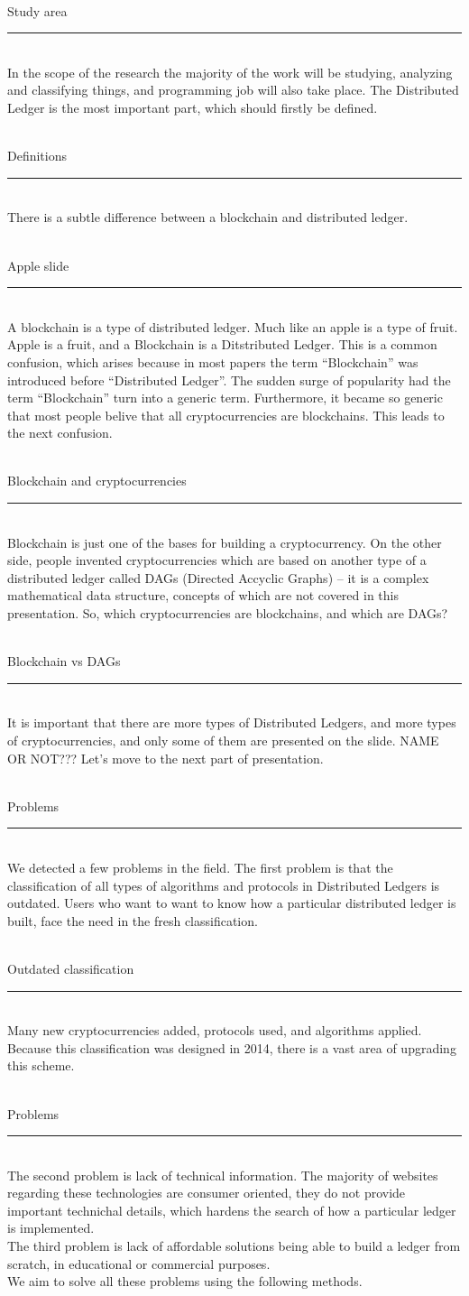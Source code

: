 \documentclass[12pt]{article}
\renewcommand{\line}[1]{\noindent\\{#1}\vspace{-0.42cm}\\\rule{\textwidth}{1pt}\\}
\begin{document}
\line{Study area}
In the scope of the research the majority of the work will be studying,
analyzing and classifying things, and programming job will also take place.
The Distributed Ledger is the most important part, which should firstly be
defined.


\line{Definitions}
There is a subtle difference between a blockchain and distributed ledger.

\line{Apple slide}
A blockchain is a type of distributed ledger. Much like an apple is a type of
fruit. Apple is a fruit, and a Blockchain is a Ditstributed Ledger. This is a
common confusion, which arises because in most papers the term ``Blockchain''
was introduced before ``Distributed Ledger''. The sudden surge of popularity
had the term ``Blockchain'' turn into a generic term. Furthermore, it became so
generic that most people belive that all cryptocurrencies are blockchains. This
leads to the next confusion.

\line{Blockchain and cryptocurrencies}
Blockchain is just one of the bases for building a cryptocurrency. On the other
side, people invented cryptocurrencies which are based on another type of a
distributed ledger called DAGs (Directed Accyclic Graphs) -- it is a complex
mathematical data structure, concepts of which are not covered in this
presentation. So, which cryptocurrencies are blockchains, and which are DAGs?

\line{Blockchain vs DAGs}
It is important that there are more types of Distributed Ledgers, and more
types of cryptocurrencies, and only some of them are presented on the slide.
NAME OR NOT??? Let's move to the next part of presentation.

\line{Problems}
We detected a few problems in the field. The first problem is that the
classification of all types of algorithms and protocols in Distributed Ledgers
is outdated. Users who want to want to know how a particular distributed ledger
is built, face the need in the fresh classification.

\line{Outdated classification}
Many new cryptocurrencies added, protocols used, and algorithms applied.
Because this classification was designed in 2014, there is a vast area of
upgrading this scheme.

\line{Problems}
The second problem is lack of technical information. The majority of websites
regarding these technologies are consumer oriented, they do not provide
important technichal details, which hardens the search of how a particular
ledger is implemented.\\
The third problem is lack of affordable solutions being able to build a ledger
from scratch, in educational or commercial purposes.\\
We aim to solve all these problems using the following methods.
\end{document}
